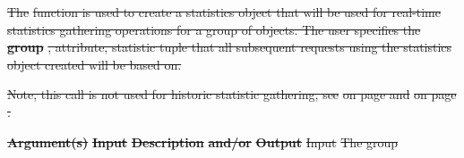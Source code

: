 \documentclass[12pt]{report} %
\providecommand{\DIFdeltex}[1]{{\protect\color{red}\sout{#1}}}                      %
\providecommand{\DIFdelend}{} %
\providecommand{\DIFdel}[1]{\texorpdfstring{\DIFdeltex{#1}}{}} %
\DeclareRobustCommand{\DIFdelend}{\DIFOaddend \let\includegraphics\DIFOincludegraphics} %
\begin{document}
\DIFdel{The }%
\DIFdel{function is used to create a statistics object that will be used for real-time statistics gathering operations for a group of objects. 
The user specifies the }\textbf{\DIFdel{group}}%
\DIFdel{, attribute, statistic tuple that all subsequent requests using the statistics object created will be based on. 
}%

\DIFdel{Note, this call is not used for historic statistic gathering, see }%
\DIFdel{on page \pageref{func:ObjGetStat} and }%
\DIFdel{on page \pageref{func:GrpGetStats}.
}%

\textbf{\DIFdel{Argument(s)}} %
\textbf{\DIFdel{Input }}  %
\textbf{\DIFdel{Description}} %
\textbf{\DIFdel{and/or}}     %
\textbf{\DIFdel{Output}} %
\DIFdel{Input  }%
\DIFdel{The group }\DIFdelend %
\end{document}
